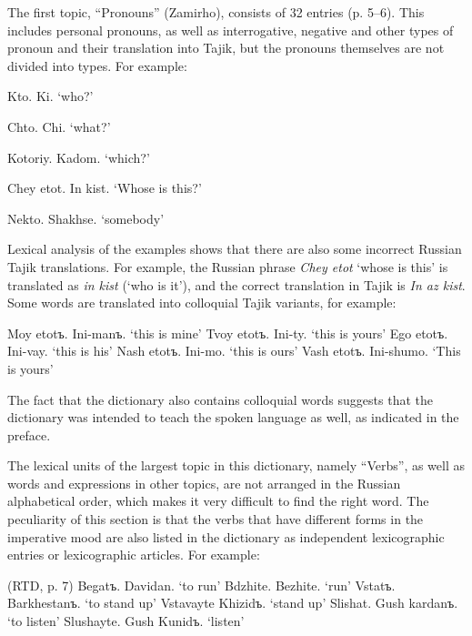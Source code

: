 \documentclass[output=paper,colorlinks,citecolor=brown,arabicfont,chinesefont]{langscibook}
\begin{document}
The first topic, “Pronouns” (Zamirho), consists of 32 entries (p. 5--6). This includes personal pronouns, as well as interrogative, negative and other types of pronoun and their translation into Tajik, but the pronouns themselves are not divided into types. For example: 

\ea
    \ea Kto.		Ki.
        \glt `who?'

    \ex Chto.		Chi.
        \glt `what?' 		

    \ex Kotoriy. 	Kadom.
        \glt `which?'  	 

    \ex Chey etot.   In kist.
        \glt `Whose is this?'  	

    \ex Nekto. 	Shakhse.
        \glt `somebody'  
    \z
\z

Lexical analysis of the examples shows that there are also some incorrect  Russian  Tajik translations. For example, the Russian phrase \textit{Chey etot} `whose is this' is translated as \textit{in kist} (`who is it'), and the correct translation in Tajik is \textit{In az kist}. Some words are translated into colloquial Tajik variants, for example: 

\ea
    \ea Moy etotъ. 		 Ini-manъ.
    \glt `this is mine' 		
    \ex Tvoy etotъ.		 Ini-ty.
    \glt `this is yours' 		
    \ex Ego etotъ.		 Ini-vay.
    \glt `this is his' 		
    \ex Nash etotъ.  	 Ini-mo.
    \glt `this is ours'  		
    \ex Vash etotъ. 	Ini-shumo.
    \glt `This is yours' 
    \z
\z

The fact that the dictionary also contains colloquial words suggests that the dictionary was intended to teach the spoken language as well, as indicated in the preface.

The lexical units of the largest topic in this dictionary, namely “Verbs”, as well as words and expressions in other topics, are not arranged in the Russian alphabetical order, which makes it very difficult to find the right word. The peculiarity of this section is that the verbs that have different forms in the imperative mood are also listed in the dictionary as independent lexicographic entries or lexicographic articles. For example:

\ea (RTD, p. 7)
    \ea Begatъ.		          Davidan.
        \glt `to run'  		
    \ex Bdzhite.       		Bezhite.
        \glt `run' 		
    \ex Vstatъ.        		Barkhestanъ.
        \glt `to stand up'  	
    \ex Vstavayte 			Khizidъ.
        \glt `stand up'  		
    \ex Slishat. 			Gush kardanъ.
        \glt `to listen'  	
    \ex Slushayte.    		Gush Kunidъ.
        \glt `listen'
    \z
\z
\end{document}
